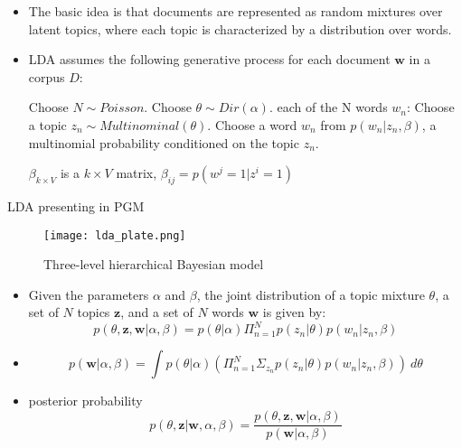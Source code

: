 \documentclass{beamer}
\begin{document}
\begin{frame}
    \begin{itemize}
    \item {
    The basic idea is that documents are represented as random mixtures over latent topics, where each topic
    is characterized by a distribution over words.
    }

    \item {
    LDA assumes the following generative process for each document $\textbf{w}$ in a corpus $D$:
    \begin{codebox}
        \li Choose $N \sim Poisson$.
        \li Choose $\theta \sim Dir(\alpha)$.
        \li \For each of the N words $w_n$:
        \li    \Do
                Choose a topic $z_n \sim Multinominal(\theta)$.
        \li     Choose a word $w_n$ from $p(w_n|z_n,\beta)$, a multinomial
        \li        probability conditioned on the topic $z_n$.
            \End
    \end{codebox}

    $\beta_{k \times V}$ is a $k \times V$ matrix, $\beta_{ij} = p(w^j=1|z^i=1)$
    }
    \end{itemize} 

\end{frame}

\begin{frame}{LDA presenting in PGM}
\begin{figure}[htbp]
	\centerline{\texttt{[image: lda\_plate.png]}}
	\caption[]{\label{c} Three-level hierarchical Bayesian model}
\end{figure}
\end{frame}


\begin{frame}
\begin{itemize}
	\item {
	Given the parameters $\alpha$ and $\beta$, the joint distribution of a topic
	mixture $\theta$, a set of $N$ topics $\textbf{z}$, and a set of $N$ words 
	$\textbf{w}$ is given by:
	\begin{equation}
	p( \theta ,\textbf{z},\textbf{w}| \alpha , \beta ) = 
	p( \theta | \alpha ) \Pi _{n=1}^Np(z_n| \theta )p(w_n|z_n, \beta )
	\end{equation}
	}
	\item {
	\begin{equation}
	p( \textbf{w}| \alpha , \beta ) = \int
	p( \theta | \alpha ) (\Pi _{n=1}^N  \Sigma_{z_n}  p(z_n| \theta )p(w_n|z_n,  \beta ))\ d\theta
	\end{equation}
	}
	\item {
	posterior probability
	\begin{equation}
	p(\theta,\textbf{z}|\textbf{w},\alpha,\beta) = 
	\frac{p( \theta ,\textbf{z},\textbf{w}| \alpha , \beta )}
	{p( \textbf{w}| \alpha , \beta )}
	\end{equation}
	}
\end{itemize}
\end{frame}
\end{document}
